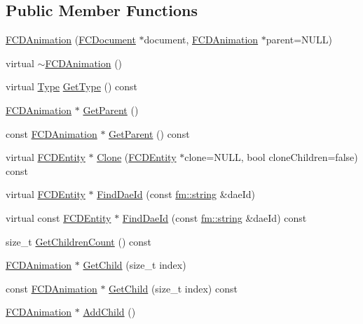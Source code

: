 \subsection*{Public Member Functions}
\begin{DoxyCompactItemize}
\item 
\hyperlink{classFCDAnimation_a2ea6557524f3013849f60205215f9e64}{FCDAnimation} (\hyperlink{classFCDocument}{FCDocument} $\ast$document, \hyperlink{classFCDAnimation}{FCDAnimation} $\ast$parent=NULL)
\item 
virtual \hyperlink{classFCDAnimation_a3c7b9e277d2a7444caf5400747557ea1}{$\sim$FCDAnimation} ()
\item 
virtual \hyperlink{classFCDEntity_a9301a4bd5f4d4190ec13e40db4effdd7}{Type} \hyperlink{classFCDAnimation_a91e3239617da238768340a8bf62b4132}{GetType} () const 
\item 
\hyperlink{classFCDAnimation}{FCDAnimation} $\ast$ \hyperlink{classFCDAnimation_a968e8f57dbe5c45b97c876e76b9caa98}{GetParent} ()
\item 
const \hyperlink{classFCDAnimation}{FCDAnimation} $\ast$ \hyperlink{classFCDAnimation_a65e7147ad3c70f725f09ae391e2ea956}{GetParent} () const 
\item 
virtual \hyperlink{classFCDEntity}{FCDEntity} $\ast$ \hyperlink{classFCDAnimation_a1b23f8e4444121882edf5418c094b023}{Clone} (\hyperlink{classFCDEntity}{FCDEntity} $\ast$clone=NULL, bool cloneChildren=false) const 
\item 
virtual \hyperlink{classFCDEntity}{FCDEntity} $\ast$ \hyperlink{classFCDAnimation_a24615001e7529a89ce80245ddbea2a0e}{FindDaeId} (const \hyperlink{classfm_1_1stringT}{fm::string} \&daeId)
\item 
virtual const \hyperlink{classFCDEntity}{FCDEntity} $\ast$ \hyperlink{classFCDAnimation_a8e3f44f012007ca3b3f9b125c0fb8771}{FindDaeId} (const \hyperlink{classfm_1_1stringT}{fm::string} \&daeId) const 
\item 
size\_\-t \hyperlink{classFCDAnimation_a2e978db4aac9e1d378b31bd5652fe951}{GetChildrenCount} () const 
\item 
\hyperlink{classFCDAnimation}{FCDAnimation} $\ast$ \hyperlink{classFCDAnimation_ae308d048c95ea72df642f06865e37c3c}{GetChild} (size\_\-t index)
\item 
const \hyperlink{classFCDAnimation}{FCDAnimation} $\ast$ \hyperlink{classFCDAnimation_a49937056a91b0676fe3604457c579009}{GetChild} (size\_\-t index) const 
\item 
\hyperlink{classFCDAnimation}{FCDAnimation} $\ast$ \hyperlink{classFCDAnimation_a3e0b21ac9ffa48f85c0c7000b41ad555}{AddChild} ()

\end{DoxyCompactItemize}
